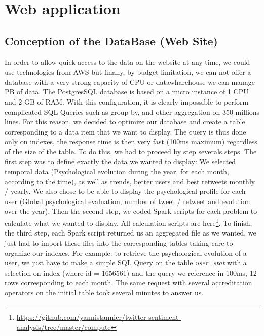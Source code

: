 \documentclass{acmtog} %
\begin{document}
\section{Web application}
\label{sec:web_application}


\subsection{Conception of the DataBase (Web Site)}
\label{subsub:conception_db}

In order to allow quick access to the data on the website at any time, we could use technologies from AWS but finally, by budget limitation, we can not offer a database with a very strong capacity of CPU or datawharehouse we can manage PB of data. The PostgresSQL database is based on a micro instance of 1 CPU and 2 GB of RAM.
With this configuration, it is clearly impossible to perform complicated SQL Queries such as group by, and other aggregation on 350 millions lines.
For this reason, we decided to optimize our database and create a table corresponding to a data item that we want to display. The query is thus done only on indexes, the response time is then very fast (100ms maximum) regardless of the size of the table.
To do this, we had to proceed by step severals steps.
The first step was to define exactly the data we wanted to display: We selected temporal data (Psychological evolution during the year, for each month, according to the time), as well as trends, better users and best retweets monthly / yearly. We also chose to be able to display the psychological profile for each user (Global psychological evaluation, number of tweet / retweet and evolution over the year).
Then the second step, we coded Spark scripts for each problem to calculate what we wanted to display. All calculation scripts are here\footnote{\url{https://github.com/yannistannier/twitter-sentiment-analysis/tree/master/compute}}. 
To finish, the third step, each Spark script returned us an aggregated file as we wanted, we just had to import these files into the corresponding tables taking care to organize our indexes.
For example: to retrieve the psychological evolution of a user, we just have to make a simple SQL Query on the table {\itshape user\_stat} with a selection on index (where id = 1656561) and the query we reference in 100ms, 12 rows corresponding to each month. The same request with several accreditation operators on the initial table took several minutes to answer us.
\end{document}
